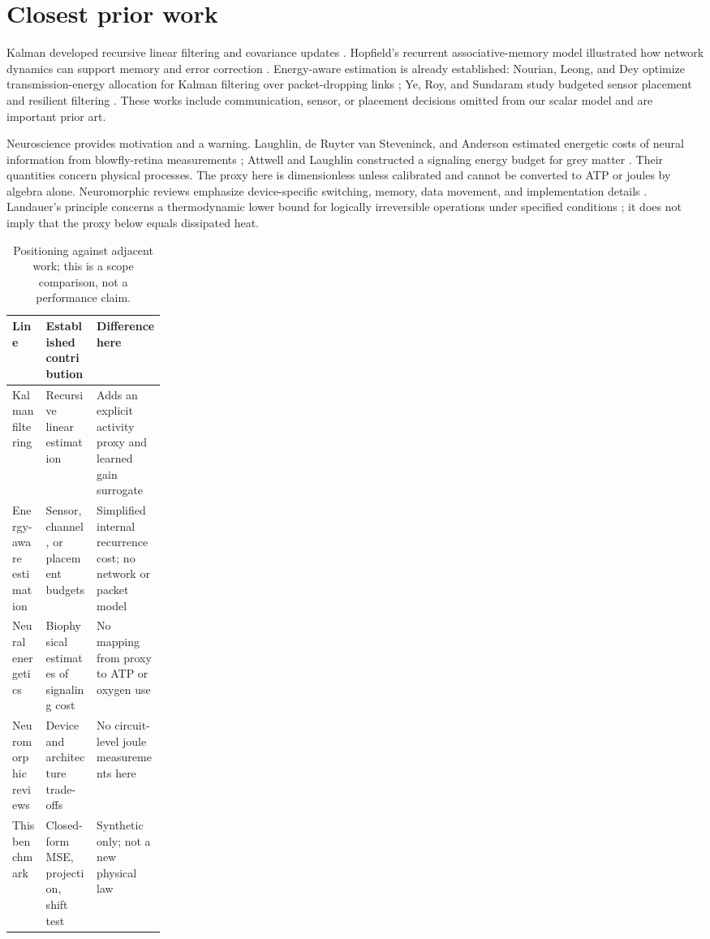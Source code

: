 \documentclass[10pt,a4paper]{article}
\begin{document}
\section{Closest prior work}
Kalman developed recursive linear filtering and covariance updates \citep{kalman1960}. Hopfield's recurrent associative-memory model illustrated how network dynamics can support memory and error correction \citep{hopfield1982}. Energy-aware estimation is already established: Nourian, Leong, and Dey optimize transmission-energy allocation for Kalman filtering over packet-dropping links \citep{nourian2014}; Ye, Roy, and Sundaram study budgeted sensor placement and resilient filtering \citep{ye2020}. These works include communication, sensor, or placement decisions omitted from our scalar model and are important prior art.

Neuroscience provides motivation and a warning. Laughlin, de Ruyter van Steveninck, and Anderson estimated energetic costs of neural information from blowfly-retina measurements \citep{laughlin1998}; Attwell and Laughlin constructed a signaling energy budget for grey matter \citep{attwell2001}. Their quantities concern physical processes. The proxy here is dimensionless unless calibrated and cannot be converted to ATP or joules by algebra alone. Neuromorphic reviews emphasize device-specific switching, memory, data movement, and implementation details \citep{ferreira2025,abuhamra2025}. Landauer's principle concerns a thermodynamic lower bound for logically irreversible operations under specified conditions \citep{landauer1961}; it does not imply that the proxy below equals dissipated heat.

\begin{table}[htbp]\centering
\caption{Positioning against adjacent work; this is a scope comparison, not a performance claim.}\label{tab:prior}\small
\begin{tabularx}{\linewidth}{@{}p{0.22\linewidth}X X@{}}
\toprule
Line & Established contribution & Difference here\\\midrule
Kalman filtering \citep{kalman1960} & Recursive linear estimation & Adds an explicit activity proxy and learned gain surrogate\\
Energy-aware estimation \citep{nourian2014,ye2020} & Sensor, channel, or placement budgets & Simplified internal recurrence cost; no network or packet model\\
Neural energetics \citep{laughlin1998,attwell2001} & Biophysical estimates of signaling cost & No mapping from proxy to ATP or oxygen use\\
Neuromorphic reviews \citep{ferreira2025,abuhamra2025} & Device and architecture trade-offs & No circuit-level joule measurements here\\
This benchmark & Closed-form MSE, projection, shift test & Synthetic only; not a new physical law\\
\bottomrule
\end{tabularx}\end{table}
\end{document}
